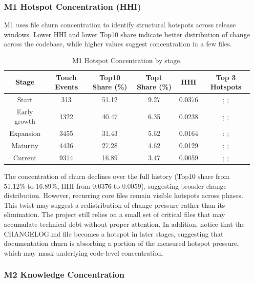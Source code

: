 \documentclass[11pt, a4paper]{article}
\begin{document}
\subsubsection{M1 Hotspot Concentration (HHI)}

M1 uses file churn concentration to identify structural hotspots across release windows. Lower HHI and lower Top10 share indicate better distribution of change across the codebase, while higher values suggest concentration in a few files.

\begin{table}[H]
\centering
\small
\begin{tabularx}{\textwidth}{|C|C|C|C|C|C|}
    \hline
    \textbf{Stage} & \textbf{Touch Events} & \textbf{Top10 Share (\%)} & \textbf{Top1 Share (\%)} & \textbf{HHI} & \textbf{Top 3 Hotspots} \\
    \hline
    Start & 313 & 51.12 & 9.27 & 0.0376 & ; ;  \\
    \hline
    Early growth & 1322 & 40.47 & 6.35 & 0.0238 & ; ;  \\
    \hline
    Expansion & 3455 & 31.43 & 5.62 & 0.0164 & ; ;  \\
    \hline
    Maturity & 4436 & 27.28 & 4.62 & 0.0129 & ; ;  \\
    \hline
    Current & 9314 & 16.89 & 3.47 & 0.0059 & ; ;  \\
    \hline
\end{tabularx}
\caption{M1 Hotspot Concentration by stage.}
\label{tab:m1_hotspot_risk}
\end{table}

The concentration of churn declines over the full history (Top10 share from 51.12\% to 16.89\%, HHI from 0.0376 to 0.0059), suggesting broader change distribution. However, recurring core files remain visible hotspots across phases. This twist may suggest a redistribution of change pressure rather than its elimination. The project still relies on a small set of critical files that may accumulate technical debt without proper attention.
In addition, notice that the CHANGELOG.md file becomes a hotspot in later stages, suggesting that documentation churn is absorbing a portion of the measured hotspot pressure, which may mask underlying code-level concentration.


\subsubsection{M2 Knowledge Concentration}
\end{document}

